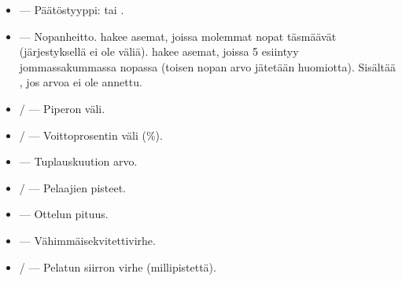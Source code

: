 \documentclass[letterpaper,10pt,finnish]{sphinxmanual}
\begin{document}
\sphinxAtStartPar
{}
\begin{itemize}
\item {} 
\sphinxAtStartPar
{} — Päätöstyyppi:  tai .

\item {} 
\sphinxAtStartPar
{} — Nopanheitto.  hakee asemat, joissa molemmat nopat täsmäävät (järjestyksellä ei ole väliä).  hakee asemat, joissa 5 esiintyy jommassakummassa nopassa (toisen nopan arvo jätetään huomiotta). Sisältää , jos \sphinxhyphen{}arvoa ei ole annettu.

\item {} 
\sphinxAtStartPar
{} /  — Pip\sphinxhyphen{}eron väli.

\item {} 
\sphinxAtStartPar
{} /  — Voittoprosentin väli (\%).

\item {} 
\sphinxAtStartPar
{} — Tuplauskuution arvo.

\item {} 
\sphinxAtStartPar
{} /  — Pelaajien pisteet.

\item {} 
\sphinxAtStartPar
{} — Ottelun pituus.

\item {} 
\sphinxAtStartPar
{} — Vähimmäisekvitettivirhe.

\item {} 
\sphinxAtStartPar
{} /  — Pelatun siirron virhe (millipistettä).


\end{itemize}
\end{document}
